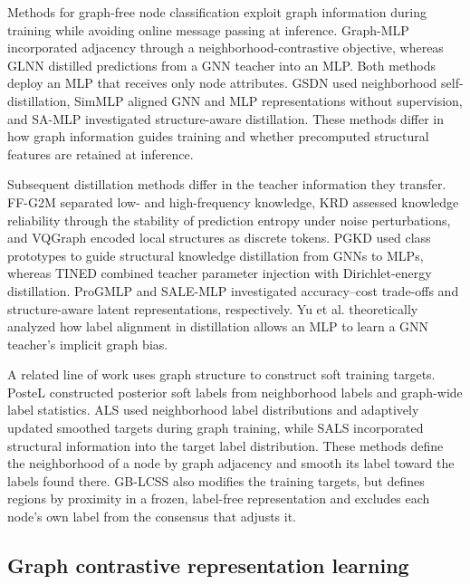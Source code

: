 \documentclass[10pt,letterpaper,nopreprintline]{elsarticle}
\theoremstyle{plain}
\begin{document}
Methods for graph-free node classification exploit graph information during training while avoiding online message passing at inference. Graph-MLP \cite{ref3} incorporated adjacency through a neighborhood-contrastive objective, whereas GLNN \cite{ref4} distilled predictions from a GNN teacher into an MLP. Both methods deploy an MLP that receives only node attributes. GSDN \cite{ref40} used neighborhood self-distillation, SimMLP \cite{ref41} aligned GNN and MLP representations without supervision, and SA-MLP \cite{ref44} investigated structure-aware distillation. These methods differ in how graph information guides training and whether precomputed structural features are retained at inference.

Subsequent distillation methods differ in the teacher information they transfer. FF-G2M \cite{ref45} separated low- and high-frequency knowledge, KRD \cite{ref46} assessed knowledge reliability through the stability of prediction entropy under noise perturbations, and VQGraph \cite{ref47} encoded local structures as discrete tokens. PGKD \cite{ref48} used class prototypes to guide structural knowledge distillation from GNNs to MLPs, whereas TINED \cite{ref49} combined teacher parameter injection with Dirichlet-energy distillation. ProGMLP \cite{ref51} and SALE-MLP \cite{ref52} investigated accuracy--cost trade-offs and structure-aware latent representations, respectively. Yu et al. \cite{ref53} theoretically analyzed how label alignment in distillation allows an MLP to learn a GNN teacher's implicit graph bias.

A related line of work uses graph structure to construct soft training targets. PosteL \cite{ref54} constructed posterior soft labels from neighborhood labels and graph-wide label statistics. ALS \cite{ref55} used neighborhood label distributions and adaptively updated smoothed targets during graph training, while SALS \cite{ref56} incorporated structural information into the target label distribution. These methods define the neighborhood of a node by graph adjacency and smooth its label toward the labels found there. GB-LCSS also modifies the training targets, but defines regions by proximity in a frozen, label-free representation and excludes each node's own label from the consensus that adjusts it.

\subsection{Graph contrastive representation learning}\label{sec:2.4}
\end{document}
